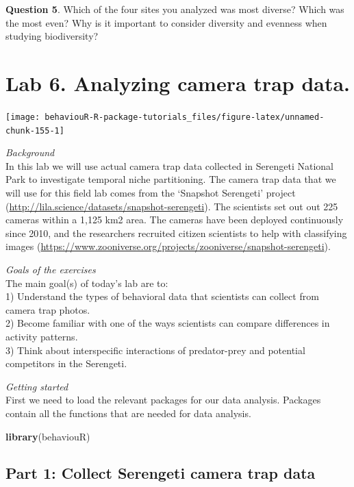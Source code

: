 \documentclass[]{book}
\newenvironment{Shaded}{\begin{snugshade}}{\end{snugshade}}
\newcommand{\KeywordTok}[1]{\textcolor[rgb]{0.13,0.29,0.53}{\textbf{#1}}}
\newcommand{\NormalTok}[1]{#1}
\begin{document}
\textbf{Question 5}. Which of the four sites you analyzed was most diverse? Which was the most even? Why is it important to consider diversity and evenness when studying biodiversity?

\hypertarget{lab-6.-analyzing-camera-trap-data.}{%
\chapter{Lab 6. Analyzing camera trap data.}\label{lab-6.-analyzing-camera-trap-data.}}

\begin{center}\texttt{[image: behaviouR-R-package-tutorials\_files/figure-latex/unnamed-chunk-155-1]} \end{center}

\emph{Background}\\
In this lab we will use actual camera trap data collected in Serengeti National Park to investigate temporal niche partitioning. The camera trap data that we will use for this field lab comes from the `Snapshot Serengeti' project (\url{http://lila.science/datasets/snapshot-serengeti}). The scientists set out out 225 cameras within a 1,125 km2 area. The cameras have been deployed continuously since 2010, and the researchers recruited citizen scientists to help with classifying images (\url{https://www.zooniverse.org/projects/zooniverse/snapshot-serengeti}).

\emph{Goals of the exercises}\\
The main goal(s) of today's lab are to:\\
1) Understand the types of behavioral data that scientists can collect from camera trap photos.\\
2) Become familiar with one of the ways scientists can compare differences in activity patterns.\\
3) Think about interspecific interactions of predator-prey and potential competitors in the Serengeti.

\emph{Getting started}\\
First we need to load the relevant packages for our data analysis. Packages contain all the functions that are needed for data analysis.

\begin{Shaded}
\begin{Highlighting}[]
\KeywordTok{library}\NormalTok{(behaviouR)}
\end{Highlighting}
\end{Shaded}

\hypertarget{part-1-collect-serengeti-camera-trap-data}{%
\section{Part 1: Collect Serengeti camera trap data}\label{part-1-collect-serengeti-camera-trap-data}}
\end{document}
